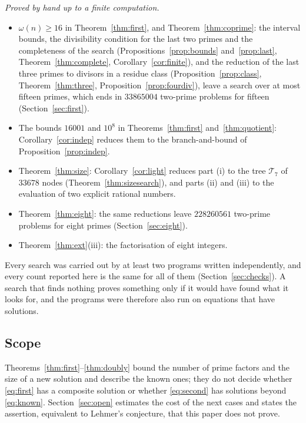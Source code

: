 \documentclass[11pt,reqno]{amsart}
\numberwithin{equation}{section}
\theoremstyle{plain}
\theoremstyle{definition}
\theoremstyle{remark}
\begin{document}
\emph{Proved by hand up to a finite computation.}
\begin{itemize}[leftmargin=*]
\item $\omega(n)\ge16$ in Theorem~\ref{thm:first}, and
Theorem~\ref{thm:coprime}: the interval bounds, the divisibility
condition for the last two primes and the completeness of the search
(Propositions~\ref{prop:bounds} and~\ref{prop:last},
Theorem~\ref{thm:complete}, Corollary~\ref{cor:finite}), and the
reduction of the last three primes to divisors in a residue class
(Proposition~\ref{prop:class}, Theorem~\ref{thm:three},
Proposition~\ref{prop:fourdiv}), leave a search over at most fifteen
primes, which ends in $33865004$ two-prime problems for fifteen
(Section~\ref{sec:first}).
\item The bounds $16001$ and $10^8$ in Theorems~\ref{thm:first}
and~\ref{thm:quotient}: Corollary~\ref{cor:indep} reduces them to the
branch-and-bound of Proposition~\ref{prop:indep}.
\item Theorem~\ref{thm:size}: Corollary~\ref{cor:light} reduces part
(i) to the tree $\mathcal T_7$ of $33678$ nodes
(Theorem~\ref{thm:sizesearch}), and parts (ii) and (iii) to the
evaluation of two explicit rational numbers.
\item Theorem~\ref{thm:eight}: the same reductions leave $228260561$
two-prime problems for eight primes (Section~\ref{sec:eight}).
\item Theorem~\ref{thm:ext}(iii): the factorisation of eight integers.
\end{itemize}
Every search was carried out by at least two programs written
independently, and every count reported here is the same for all of
them (Section~\ref{sec:checks}). A search
that finds nothing proves something only if it would have found what it
looks for, and the programs were therefore also run on equations that
have solutions.

\subsection{Scope}
Theorems~\ref{thm:first}--\ref{thm:doubly} bound the number of prime
factors and the size of a new solution and describe the known ones; they do not
decide whether \eqref{eq:first} has a composite solution or whether
\eqref{eq:second} has solutions beyond \eqref{eq:known}.
Section~\ref{sec:open} estimates the cost of the next cases and states
the assertion, equivalent to Lehmer's conjecture, that this paper does
not prove.
\end{document}
